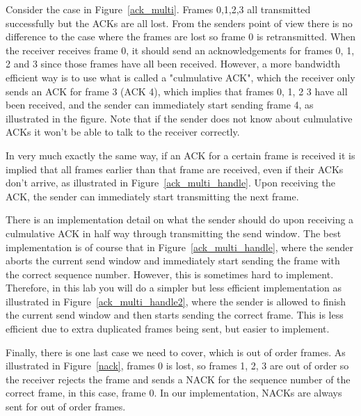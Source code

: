 \documentclass[11pt]{article}
\begin{document}
Consider the case in Figure~\ref{ack_multi}. Frames 0,1,2,3 all transmitted successfully but the ACKs are all lost.
From the senders point of view there is no difference to the case where the frames are lost so frame 0 is retransmitted.
When the receiver receives frame 0, it should send an acknowledgements for frames 0, 1, 2 and 3 since those frames have all been received.
However, a more bandwidth efficient way is to use what is called a "culmulative ACK", which the receiver only sends an ACK for frame 3 (ACK 4), which implies that frames 0, 1, 2 3 have all been received, and the sender can immediately start sending frame 4, as illustrated in the figure.
Note that if the sender does not know about culmulative ACKs it won't be able to talk to the receiver correctly.

In very much exactly the same way, if an ACK for a certain frame is received it is implied that all frames earlier than that frame are received, even if their ACKs don't arrive, as illustrated in Figure~\ref{ack_multi_handle}.
Upon receiving the ACK, the sender can immediately start transmitting the next frame.

There is an implementation detail on what the sender should do upon receiving a culmulative ACK in half way through transmitting the send window.
The best implementation is of course that in Figure~\ref{ack_multi_handle}, where the sender aborts the current send window and immediately start sending the frame with the correct sequence number.
However, this is sometimes hard to implement. Therefore, in this lab you will do a simpler but less efficient implementation as illustrated in Figure~\ref{ack_multi_handle2}, where the sender is allowed to finish the current send window and then starts sending the correct frame.
This is less efficient due to extra duplicated frames being sent, but easier to implement.

Finally, there is one last case we need to cover, which is out of order frames.
As illustrated in Figure~\ref{nack}, frames 0 is lost, so frames 1, 2, 3 are out of order so the receiver rejects the frame and sends a NACK for the sequence number of the correct frame, in this case, frame 0.
In our implementation, NACKs are always sent for out of order frames.
\end{document}
